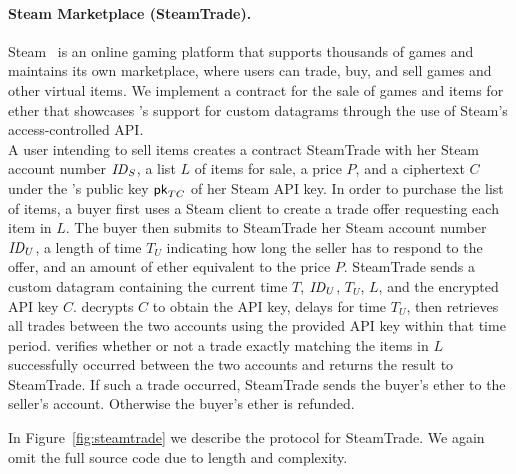 \paragraph{Steam Marketplace ({\sf SteamTrade}).} Steam~\cite{steam} is an online gaming platform that supports thousands of games and maintains its own marketplace, where users can trade, buy, and sell games and other virtual items.  We implement a contract for the sale of games and items for ether that showcases \tc's support for custom datagrams through the use of Steam's access-controlled API.\\
\indent A user intending to sell items creates a contract {\sf SteamTrade} with her Steam account number ${\it ID}_S$, a list $L$ of items for sale, a price $P$, and a ciphertext $C$ under the \tc's public key ${\sf pk}_{TC}$ of her Steam API key.  In order to purchase the list of items, a buyer first uses a Steam client to create a trade offer requesting each item in $L$.  The buyer then submits to {\sf SteamTrade} her Steam account number ${\it ID}_U$, a length of time $T_U$ indicating how long the seller has to respond to the offer, and an amount of ether equivalent to the price $P$.  {\sf SteamTrade} sends \tc a custom datagram containing the current time $T$, ${\it ID}_U$, $T_U$, $L$, and the encrypted API key $C$.  \tc decrypts $C$ to obtain the API key, delays for time $T_U$, then retrieves all trades between the two accounts using the provided API key within that time period.  \tc verifies whether or not a trade exactly matching the items in $L$ successfully occurred between the two accounts and returns the result to {\sf SteamTrade}.  If such a trade occurred, {\sf SteamTrade} sends the buyer's ether to the seller's account.  Otherwise the buyer's ether is refunded.

In Figure~\ref{fig:steamtrade} we describe the protocol for {\sf SteamTrade}.
We again omit the full source code due to length and complexity.


